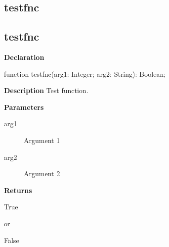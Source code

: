 \documentclass{report}
\newif\ifpdf
\begin{document}
\subsection*{\large{\textbf{testfnc}}\normalsize\hspace{1ex}\hrulefill}
\else
\subsection*{testfnc}
\fi
\label{ok_ignore_leading_impl-testfnc}
\begin{list}{}{
\setlength{\itemindent}{0cm}
\setlength{\listparindent}{0cm}
\setlength{\leftmargin}{\evensidemargin}
\addtolength{\leftmargin}{\tmplength}
\settowidth{\labelsep}{X}
\addtolength{\leftmargin}{\labelsep}
\setlength{\labelwidth}{\tmplength}
}
\item[\textbf{Declaration}\hfill]
\ifpdf
\begin{flushleft}
\fi
\begin{ttfamily}
function testfnc(arg1: Integer; arg2: String): Boolean;\end{ttfamily}

\ifpdf
\end{flushleft}
\fi

\par
\item[\textbf{Description}]
Test function.

  \par
\item[\textbf{Parameters}]
\begin{description}
\item[arg1] Argument 1
\item[arg2] Argument 2
\end{description}
\item[\textbf{Returns}]\begin{ttfamily}True\end{ttfamily} or \begin{ttfamily}False\end{ttfamily}


\end{list}
\end{document}
